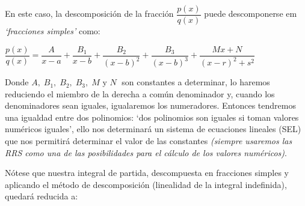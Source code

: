 En este caso, la descomposición de la fracción $\dfrac {p(x)}{q(x)}$ puede descomponerse em \emph{`fracciones simples'} como:

\hspace{10mm} $\dfrac {p(x)}{q(x)} = \dfrac {A}{x-a} +\dfrac {B_1}{x-b} +\dfrac {B_2}{(x-b)^2} +\dfrac {B_3}{(x-b)^3} +\dfrac {Mx+N}{(x-r)^2+s^2} $

Donde $A, \; B_1, \; B_2, \; B_3, \; M \text { y } N\; $ son constantes a determinar, lo haremos reduciendo el miembro de la derecha a común denominador y, cuando los denominadores sean iguales, igualaremos los numeradores. Entonces tendremos una igualdad entre dos polinomios: `dos polinomios son iguales si toman valores numéricos iguales', ello nos determinará un sistema de ecuaciones lineales (SEL) que nos permitirá   determinar el valor de las constantes \emph{(siempre usaremos las RRS como una de las posibilidades para el cálculo de los valores numéricos)}.

Nótese que nuestra integral de partida, descompuesta en fracciones simples y aplicando el método de descomposición (linealidad de la integral indefinida), quedará reducida a:



